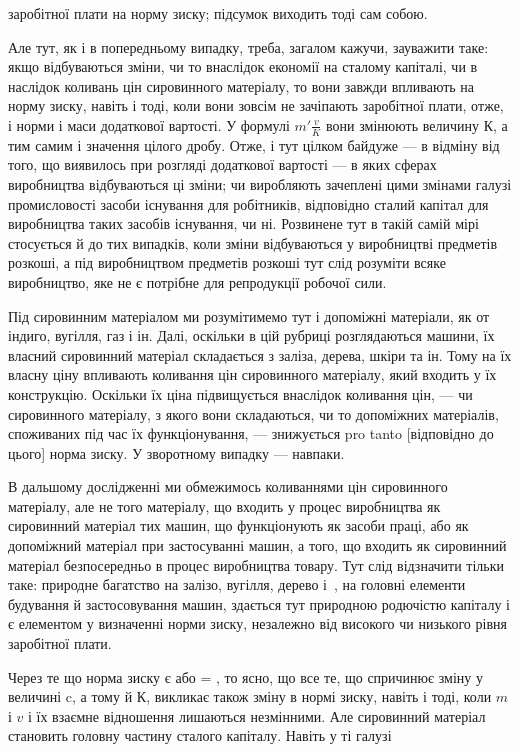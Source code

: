 \parcont{}  %
заробітної плати на норму зиску; підсумок виходить тоді сам
собою.

Але тут, як і в попередньому випадку, треба, загалом кажучи, зауважити таке: якщо відбуваються
зміни, чи то внаслідок економії на сталому капіталі, чи в наслідок коливань цін сировинного
матеріалу, то вони завжди впливають на норму
зиску, навіть і тоді, коли вони зовсім не зачіпають заробітної плати, отже, і норми і маси
додаткової вартості. У формулі $m' \frac{v}{K}$ вони змінюють величину $К$, а тим самим і значення цілого дробу.
Отже, і тут цілком байдуже — в відміну від того, що виявилось при розгляді додаткової вартості — в
яких сферах виробництва відбуваються ці зміни; чи виробляють зачеплені цими змінами галузі
промисловості засоби існування для робітників,
відповідно сталий капітал для виробництва таких засобів існування, чи ні. Розвинене тут в такій
самій мірі стосується й до
тих випадків, коли зміни відбуваються у виробництві предметів
розкоші, а під виробництвом предметів розкоші тут слід розуміти всяке виробництво, яке не є потрібне
для репродукції робочої сили.

Під сировинним матеріалом ми розумітимемо тут і допоміжні
матеріали, як от індиго, вугілля, газ і ін. Далі, оскільки в цій
рубриці розглядаються машини, їх власний сировинний матеріал
складається з заліза, дерева, шкіри та ін. Тому на їх власну
ціну впливають коливання цін сировинного матеріалу, який входить у їх конструкцію. Оскільки їх ціна
підвищується внаслідок коливання цін, — чи сировинного матеріалу, з якого вони складаються, чи то
допоміжних матеріалів, споживаних під час
їх функціонування, — знижується pro tanto [відповідно до цього]
норма зиску. У зворотному випадку — навпаки.

В дальшому дослідженні ми обмежимось коливаннями цін сировинного матеріалу, але не того матеріалу,
що входить у процес виробництва як сировинний матеріал тих машин, що функціонують як засоби праці,
або як допоміжний матеріал при застосуванні машин, а того, що входить як сировинний матеріал
безпосередньо в процес виробництва товару. Тут слід відзначити тільки таке: природне багатство на
залізо, вугілля, дерево
і~, на головні елементи будування й застосовування машин,
здається тут природною родючістю капіталу і є елементом
у визначенні норми зиску, незалежно від високого чи низького
рівня заробітної плати.

Через те що норма зиску є  або = , то ясно, що все те, що спричинює зміну у величині c, а
тому й $К$, викликає
також зміну в нормі зиску, навіть і тоді, коли $m$ і $v$ і їх взаємне
відношення лишаються незмінними. Але сировинний матеріал
становить головну частину сталого капіталу. Навіть у ті галузі
\parbreak{}  %
